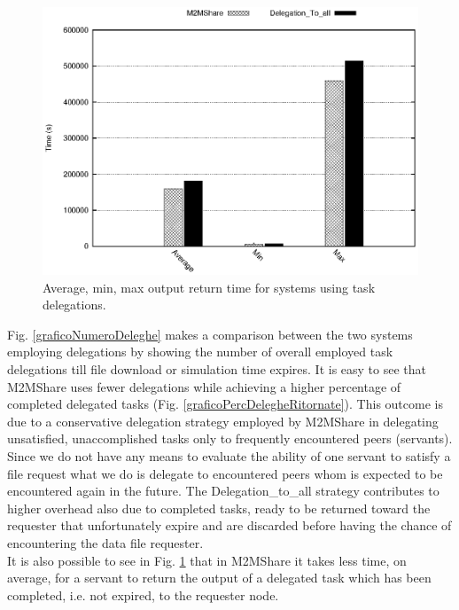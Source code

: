 \begin{figure}[ht]
\centering
\includegraphics[scale=0.7]{grafici/tempiRitornoDeleghe.eps}
\caption{Average, min, max output return time for systems using task delegations.}
\label{graficoRitornoMedioDeleghe}
\end{figure}

Fig. \ref{graficoNumeroDeleghe} makes a comparison between the two systems employing delegations by showing the number of overall employed task delegations till file download or simulation time expires. It is easy to see that M2MShare uses fewer delegations while achieving a higher percentage of completed delegated tasks (Fig. \ref{graficoPercDelegheRitornate}). This outcome is due to a conservative delegation strategy employed by M2MShare in delegating unsatisfied, unaccomplished tasks only to frequently encountered peers
(servants). Since we do not have any means to evaluate the ability of one servant to satisfy a file request what we do is delegate to encountered peers whom is expected to be encountered again in the future. The Delegation\_to\_all strategy contributes to higher overhead also due to completed tasks, ready to be returned toward the requester that unfortunately expire and are discarded before having the chance of encountering the data file requester. \\
It is also possible to see in Fig. \ref{graficoRitornoMedioDeleghe} that in M2MShare it takes less time, on average, for a servant to return the output of a delegated task which has been completed, i.e. not expired, to the requester node.
\\

